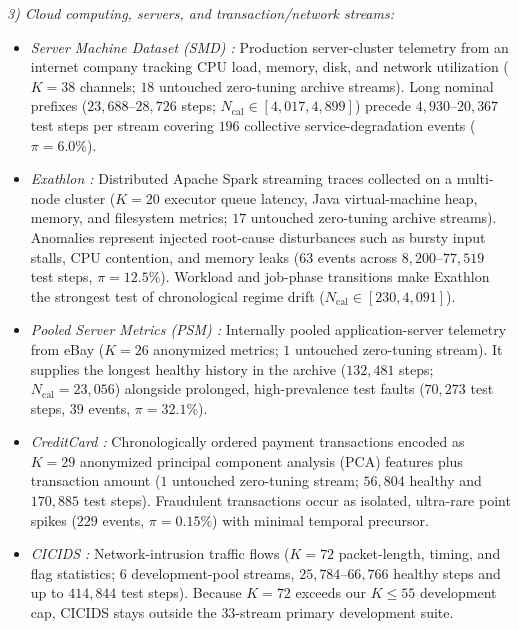 \noindent\emph{3) Cloud computing, servers, and transaction/network streams:}
\begin{itemize}[leftmargin=*, nosep, itemsep=1.5pt]
    \item \emph{Server Machine Dataset (SMD) \cite{zhou2026mtsbench}:} Production server-cluster telemetry from an internet company tracking CPU load, memory, disk, and network utilization ($K{=}38$ channels; $18$ untouched zero-tuning archive streams). Long nominal prefixes ($23{,}688\text{--}28{,}726$ steps; $N_{\text{cal}}\in[4{,}017,4{,}899]$) precede $4{,}930\text{--}20{,}367$ test steps per stream covering $196$ collective service-degradation events ($\pi{=}6.0\%$).
    \item \emph{Exathlon \cite{jacob2021exathlon}:} Distributed Apache Spark streaming traces collected on a multi-node cluster ($K{=}20$ executor queue latency, Java virtual-machine heap, memory, and filesystem metrics; $17$ untouched zero-tuning archive streams). Anomalies represent injected root-cause disturbances such as bursty input stalls, CPU contention, and memory leaks ($63$ events across $8{,}200\text{--}77{,}519$ test steps, $\pi{=}12.5\%$). Workload and job-phase transitions make Exathlon the strongest test of chronological regime drift ($N_{\text{cal}}\in[230,4{,}091]$).
    \item \emph{Pooled Server Metrics (PSM) \cite{zhou2026mtsbench}:} Internally pooled application-server telemetry from eBay ($K{=}26$ anonymized metrics; $1$ untouched zero-tuning stream). It supplies the longest healthy history in the archive ($132{,}481$ steps; $N_{\text{cal}}{=}23{,}056$) alongside prolonged, high-prevalence test faults ($70{,}273$ test steps, $39$ events, $\pi{=}32.1\%$).
    \item \emph{CreditCard \cite{zhou2026mtsbench}:} Chronologically ordered payment transactions encoded as $K{=}29$ anonymized principal component analysis (PCA) features plus transaction amount ($1$ untouched zero-tuning stream; $56{,}804$ healthy and $170{,}885$ test steps). Fraudulent transactions occur as isolated, ultra-rare point spikes ($229$ events, $\pi{=}0.15\%$) with minimal temporal precursor.
    \item \emph{CICIDS \cite{schmidl2022anomaly}:} Network-intrusion traffic flows ($K{=}72$ packet-length, timing, and flag statistics; $6$ development-pool streams, $25{,}784\text{--}66{,}766$ healthy steps and up to $414{,}844$ test steps). Because $K{=}72$ exceeds our $K{\le}55$ development cap, CICIDS stays outside the $33$-stream primary development suite.
\end{itemize}

